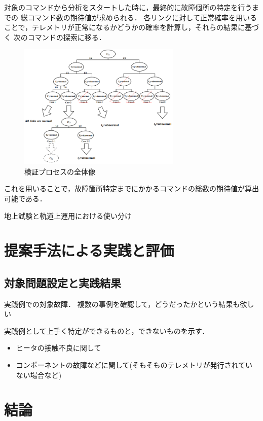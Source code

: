 \documentclass[11pt]{jsarticle}%
\begin{document}
\begin{multicols}{2}
  対象のコマンドから分析をスタートした時に，最終的に故障個所の特定を行うまでの
  総コマンド数の期待値が求められる．
  各リンクに対して正常確率を用いることで，テレメトリが正常になるかどうかの確率を計算し，それらの結果に基づく
  次のコマンドの探索に移る．
  


\begin{figure}[H]
  \centering
    \includegraphics[height=6.0cm]{../figure/all_process.png}
    \caption{検証プロセスの全体像}
    \label{fig:all_process}
\end{figure}
これを用いることで，故障箇所特定までにかかるコマンドの総数の期待値が算出可能である．


  地上試験と軌道上運用における使い分け

  \section{提案手法による実践と評価}
  \subsection{対象問題設定と実践結果}
  実践例での対象故障．
  複数の事例を確認して，どうだったかという結果も欲しい


  実践例として上手く特定ができるものと，できないものを示す．
 \begin{itemize}
   \item ヒータの接触不良に関して
   \item コンポーネントの故障などに関して(そもそものテレメトリが発行されていない場合など)
 \end{itemize}
  \subsection{}

  \section{結論}

\end{multicols}
\end{document}
